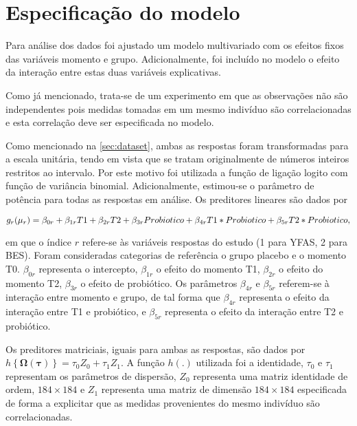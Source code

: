 
\section{Especificação do modelo}

Para análise dos dados foi ajustado um modelo multivariado com os efeitos fixos das variáveis momento e grupo. Adicionalmente, foi incluído no modelo o efeito da interação entre estas duas variáveis explicativas.

Como já mencionado, trata-se de um experimento em que as observações não são independentes pois medidas tomadas em um mesmo indivíduo são correlacionadas e esta correlação deve ser especificada no modelo. 

Como mencionado na \autoref{sec:dataset}, ambas as respostas foram transformadas para a escala unitária, tendo em vista que se tratam originalmente de números inteiros restritos ao intervalo. Por este motivo foi utilizada a função de ligação logito com função de variância binomial. Adicionalmente, estimou-se o parâmetro de potência para todas as respostas em análise. Os preditores lineares são dados por

$$
g_{r}(\mu_{r}) = \beta_{0r} + \beta_{1r} T1 + \beta_{2r} T2 + \beta_{3r} Probiotico + \\ \beta_{4r} T1*Probiotico + \beta_{5r} T2*Probiotico,
$$

\noindent em que o índice $r$ refere-se às variáveis respostas do estudo (1 para YFAS, 2 para BES). Foram consideradas categorias de referência o grupo placebo e o momento T0. $\beta_{0r}$ representa o intercepto, $\beta_{1r}$ o efeito do momento T1, $\beta_{2r}$ o efeito do momento T2, $\beta_{3r}$ o efeito de probiótico. Os parâmetros $\beta_{4r}$ e $\beta_{5r}$ referem-se à interação entre momento e grupo, de tal forma que $\beta_{4r}$ representa o efeito da interação entre T1 e probiótico, e $\beta_{5r}$ representa o efeito da interação entre T2 e probiótico.

Os preditores matriciais, iguais para ambas as respostas, são dados por $h\left \{ \boldsymbol{\Omega}(\boldsymbol{\tau}) \right \} = \tau_0Z_0 + \tau_1Z_1$. A função $h(.)$ utilizada foi a identidade, $\tau_0$ e $\tau_1$ representam os parâmetros de dispersão, $Z_0$ representa uma matriz identidade de ordem, $184 \times 184$ e $Z_1$ representa uma matriz de dimensão $184 \times 184$ especificada de forma a explicitar que as medidas provenientes do mesmo indivíduo são correlacionadas. 

